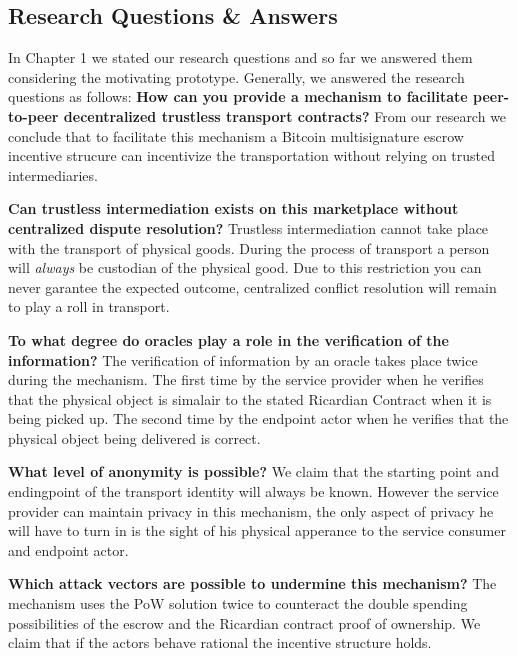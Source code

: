 \subsection{Research Questions \& Answers}

In Chapter 1 we stated our research questions and so far we answered them considering the motivating prototype. Generally, we answered the research questions as follows:
\bigbreak
\noindent \textbf{How can you provide a mechanism to facilitate peer-to-peer decentralized trustless transport contracts?} From our research we conclude that to facilitate this mechanism a Bitcoin multisignature escrow incentive strucure can incentivize the transportation without relying on trusted intermediaries.

\bigbreak
\noindent \textbf{Can trustless intermediation exists on this marketplace without centralized dispute resolution?} Trustless intermediation cannot take place with the transport of physical goods. During the process of transport a person will \textit{always} be custodian of the physical good. Due to this restriction you can never garantee the expected outcome, centralized conflict resolution will remain to play a roll in transport.


\bigbreak
\noindent \textbf{To what degree do oracles play a role in the verification of the information?} The verification of information by an oracle takes place twice during the mechanism. The first time by the service provider when he verifies that the physical object is simalair to the stated Ricardian Contract when it is being picked up. The second time by the endpoint actor when he verifies that the physical object being delivered is correct.

\bigbreak
\noindent \textbf{What level of anonymity is possible?} We claim that the starting point and endingpoint of the transport identity will always be known. However the service provider can maintain privacy in this mechanism, the only aspect of privacy he will have to turn in is the sight of his physical apperance to the service consumer and endpoint actor.

\bigbreak
\noindent \textbf{Which attack vectors are possible to undermine this mechanism?} The mechanism uses the PoW solution twice to counteract the double spending possibilities of the escrow and the Ricardian contract proof of ownership. We claim that if the actors behave rational the incentive structure holds.
\newpage

